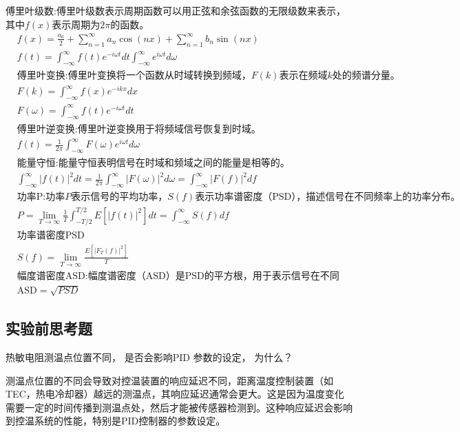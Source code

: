\documentclass[dvipsnames, svgnames,a4paper,11pt]{article}
\begin{document}
\begin{enumerate}
傅里叶级数:傅里叶级数表示周期函数可以用正弦和余弦函数的无限级数来表示，其中\(f(x)\)表示周期为\(2\pi\)的函数。
\begin{align*}
	&f(x)=\frac{a_{0}}{2}+\sum_{n=1}^{\infty}a_{n}\cos(nx)+\sum_{n=1}^{\infty}b_{n}\sin(nx)  \\
	&f(t)=\int_{-\infty}^{\infty}f(t)e^{-i\omega t}dt\int_{-\infty}^{\infty}e^{i\omega t}d\omega  \\
	&\text{傅里叶变换:傅里叶变换将一个函数从时域转换到频域，\(F(k)\)表示在频域\(k\)处的频谱分量。} \\
	&F(k )=\int_{-\infty}^{\infty}f(x)e^{-ikx}dx  \\
	&F(\omega  )=\int_{-\infty}^{\infty}f(t)e^{-i\omega t}dt  \\
	&\text{傅里叶逆变换:傅里叶逆变换用于将频域信号恢复到时域。} \\
	&f(t)=\frac{1}{2\pi}\int_{-\infty}^{\infty}F(\omega)e^{i\omega t}d\omega   \\
	&\text{能量守恒:能量守恒表明信号在时域和频域之间的能量是相等的。} \\
	&\int_{-\infty}^{\infty}|f(t)|^{2}dt=\frac{1}{2\pi}\int_{-\infty}^{\infty}|F(\omega)|^{2}d\omega=\int_{-\infty}^{\infty}|F(f)|^{2}df \\
	&\text{功率P:功率\(P\)表示信号的平均功率，\(S(f)\)表示功率谱密度（PSD），描述信号在不同频率上的功率分布。} \\
	&P=\lim_{T\to\infty}\frac{1}{T}\int_{-T/2}^{T/2}E[|f(t)|^{2}]dt=\int_{-\infty}^{\infty}S(f)df \\
	&\text{功率谱密度PSD} \\
	&S(f)=\lim_{T\to\infty}\frac{E[|F_{T}(f)|^{2}]}{T}  \\
	&\text{幅度谱密度ASD:幅度谱密度（ASD）是PSD的平方根，用于表示信号在不同频率上的振幅。} \\
	&\text{ASD}=\sqrt{PSD} 
	\end{align*}
	
	

\end{enumerate}
	
		
	
	
	\subsection{实验前思考题}
		\begin{question}
			热敏电阻测温点位置不同， 是否会影响PID 参数的设定， 为什么？
		\end{question}
			
		测温点位置的不同会导致对控温装置的响应延迟不同，距离温度控制装置（如TEC，热电冷却器）越远的测温点，其响应延迟通常会更大。这是因为温度变化需要一定的时间传播到测温点处，然后才能被传感器检测到。这种响应延迟会影响到控温系统的性能，特别是PID控制器的参数设定。
\end{document}
